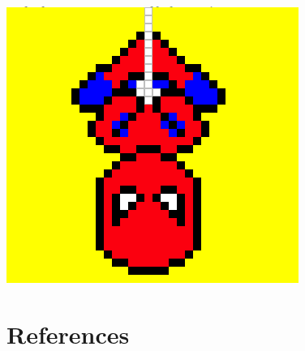 \documentclass[9pt,b5paper]{article}
\begin{document}
\includegraphics[width=.9\linewidth]{./pic/Screen_Shot_2016-05-27_at_6_08_17_PM.png}

\section{References}
\label{sec-2}
\end{document}
